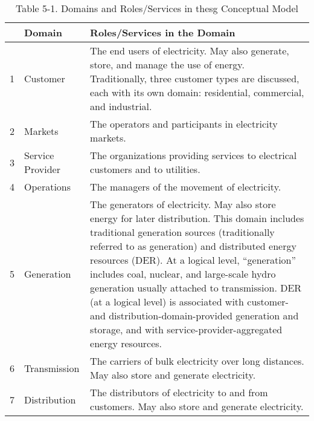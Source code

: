


\begin{table}[ht]
\centering
\begin{tabular}{|c|l| p{8.5cm}| }
\hline
&Domain &Roles/Services in the Domain \\ \hline
 1&Customer &The end users of electricity. May also generate, store, and manage the
use of energy. Traditionally, three customer types are discussed, each
with its own domain: residential, commercial, and industrial. \\ \hline
 2&Markets&The operators and participants in electricity markets. \\\hline
 3&Service Provider &The organizations providing services to electrical customers and to
 utilities. \\\hline
 4&Operations & The managers of the movement of electricity. \\ \hline
 5&Generation &The generators of electricity. May also store energy for later
distribution. This domain includes traditional generation sources
(traditionally referred to as generation) and distributed energy
resources (DER). At a logical level, “generation” includes coal,
nuclear, and large-scale hydro generation usually attached to
transmission. DER (at a logical level) is associated with customer-
and distribution-domain-provided generation and storage, and with
service-provider-aggregated energy resources.\\ \hline
 6 & Transmission & The carriers of bulk electricity over long distances. May also store
and generate electricity. \\ \hline
 7 &Distribution &The distributors of electricity to and from customers. May also store
and generate electricity. \\
\hline
\end{tabular}
\caption{Table 5-1. Domains and Roles/Services in the\acrlong{sg} Conceptual Model}
\label{tab:SmartGRID-Roles-of-domains}
\end{table}









